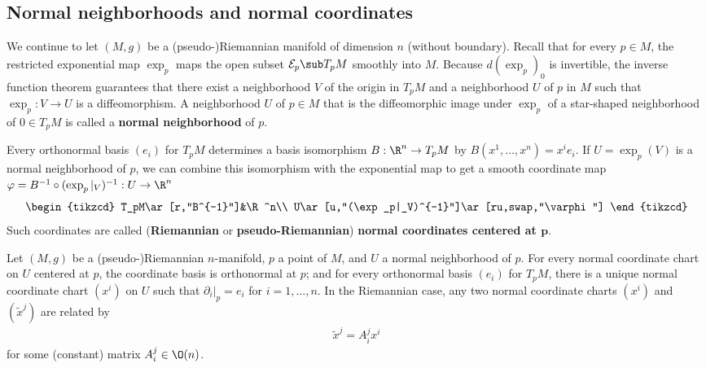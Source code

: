 \subsection{Normal neighborhoods and normal coordinates}
We continue to let $(M,g)$ be a (pseudo-)Riemannian manifold of dimension $n$ (without boundary). Recall that for every $p\in M$, the restricted exponential 
map $\exp_p$ maps the open subset $\mathcal{E}_p\sub T_pM$ smoothly into $M$. Because $d(\exp_p)_0$ is invertible, the inverse function theorem guarantees that there 
exist a neighborhood $V$ of the origin in $T_pM$ and a neighborhood $U$ of $p$ in $M$ such that $\exp_p:V\to U$ is a diffeomorphism. A neighborhood $U$ of $p\in M$ that 
is the diffeomorphic image under $\exp_p$ of a star-shaped neighborhood of $0\in T_pM$ is called a \textbf{normal neighborhood} of $p$.\par
Every orthonormal basis $(e_i)$ for $T_pM$ determines a basis isomorphism $B:\R^n\to T_pM$ by $B(x^1,\dots,x^n)=x^ie_i$. If $U=\exp_p(V)$ is a normal neighborhood of 
$p$, we can combine this isomorphism with the exponential map to get a smooth coordinate map $\varphi=B^{-1}\circ(\exp_p|_V)^{-1}:U\to\R^n$
\[\begin{tikzcd}
T_pM\ar[r,"B^{-1}"]&\R^n\\
U\ar[u,"(\exp_p|_V)^{-1}"]\ar[ru,swap,"\varphi"]
\end{tikzcd}\]
Such coordinates are called (\textbf{Riemannian} or \textbf{pseudo-Riemannian}) \textbf{normal coordinates centered at $\bm{p}$}.
\begin{proposition}\label{Riemann normal coordinate unique}
Let $(M,g)$ be a (pseudo-)Riemannian $n$-manifold, $p$ a point of $M$, and $U$ a normal neighborhood of $p$. For every normal coordinate chart on $U$ 
centered at $p$, the coordinate basis is orthonormal at $p$; and for every orthonormal basis $(e_i)$ for $T_pM$, there is a unique normal coordinate chart $(x^i)$ on 
$U$ such that $\partial_i|_p=e_i$ for $i=1,\dots,n$. In the Riemannian case, any two normal coordinate charts $(x^i)$ and $(\widetilde{x}^j)$ are related by
\begin{align}\label{Riemann normal coordinate unique-1}
\widetilde{x}^j=A^j_ix^i
\end{align}
for some (constant) matrix $A_i^j\in\O(n)$.
\end{proposition}
